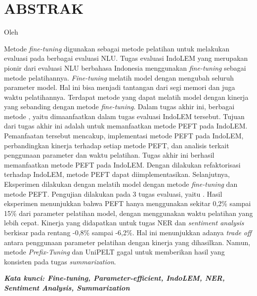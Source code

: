 \clearpage
\chapter*{ABSTRAK}

\begin{center}
    \center
    \begin{singlespace}
        \large\bfseries\MakeUppercase{\thetitle}
    
        \normalfont\normalsize
        Oleh
    
        \bfseries \theauthor
    \end{singlespace}
\end{center} 

\begin{singlespace}
    Metode \textit{fine-tuning} digunakan sebagai metode pelatihan untuk melakukan evaluasi pada berbagai evaluasi NLU. Tugas evaluasi IndoLEM yang merupakan pionir dari evaluasi NLU berbahasa Indonesia menggunakan \textit{fine-tuning} sebagai metode pelatihannya. \textit{Fine-tuning} melatih model dengan mengubah seluruh parameter model. Hal ini bisa menjadi tantangan dari segi memori dan juga waktu pelatihannya. Terdapat metode \PEFT yang dapat melatih model dengan kinerja yang sebanding dengan metode \textit{fine-tuning}. Dalam tugas akhir ini, berbagai metode \PEFT, yaitu \methodPEFT dimaanfaatkan dalam tugas evaluasi IndoLEM tersebut. Tujuan dari tugas akhir ini adalah untuk memanfaatkan metode PEFT pada IndoLEM. Pemanfaatan tersebut mencakup, implementasi metode PEFT pada IndoLEM, perbandingkan kinerja terhadap setiap metode PEFT, dan analisis terkait penggunaan parameter dan waktu pelatihan.
    Tugas akhir ini berhasil memanfaatkan metode PEFT pada IndoLEM. Dengan dilakukan refaktorisasi terhadap IndoLEM, metode PEFT dapat diimplementasikan. Selanjutnya, Eksperimen dilakukan dengan melatih model dengan metode \textit{fine-tuning} dan metode PEFT. Pengujian dilakukan pada 3 tugas evaluasi, yaitu \nlptask. Hasil eksperimen menunjukkan bahwa PEFT hanya menggunakan sekitar 0,2\% sampai 15\% dari parameter pelatihan model, dengan menggunakan waktu pelatihan yang lebih cepat. Kinerja yang didapatkan untuk tugas NER dan \textit{sentiment analysis} berkisar pada rentang -0,8\% sampai -6,2\%. Hal ini menunjukkan adanya \textit{trade off} antara penggunaan parameter pelatihan dengan kinerja yang dihasilkan. Namun, metode \textit{Prefix-Tuning} dan UniPELT gagal untuk memberikan hasil yang konsisten pada tugas \textit{summarization}.

    \textit{\textbf{Kata kunci: Fine-tuning, Parameter-efficient, IndoLEM, NER, Sentiment Analysis, Summarization}}
\end{singlespace}

\clearpage
